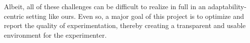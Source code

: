 \documentclass[letterpaper,twocolumn,12pt]{article}
\begin{document}
Albeit, all of these challenges can be difficult to realize in full in an adaptability-centric setting like ours. Even so, a major goal of this project is to optimize and report the quality of experimentation, thereby creating a transparent and usable environment for the experimenter. 


\end{document}
